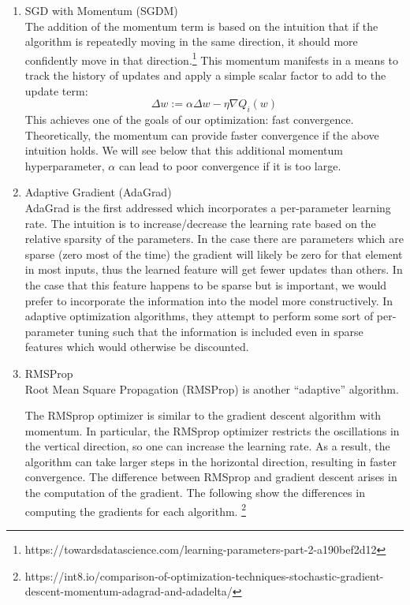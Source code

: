 \documentclass[twoside,11pt]{homework}
\DeclarePairedDelimiter{\2norm}{\lVert}{\rVert^2_2}
\newcommand{\1}[1]{\mathds{1}\left[#1\right]}
\begin{document}
\begin{enumerate}[\bf (i)]
\begin{enumerate}
      \item SGD with Momentum (SGDM) \\
        The addition of the momentum term is based on the intuition that if the
        algorithm is repeatedly moving in the same direction, it should more
        confidently move in that
        direction.\footnote{https://towardsdatascience.com/learning-parameters-part-2-a190bef2d12}
        This momentum manifests in a means to track the history of updates and
        apply a simple scalar factor to add to the update term:
        \[
        \Delta w := \alpha \Delta w - \eta \nabla Q_{i}(w)
        \]
        This achieves one of the goals of our optimization: fast convergence.
        Theoretically, the momentum can provide faster convergence if the above
        intuition holds. We will see below that this additional momentum
        hyperparameter, $\alpha$ can lead to poor convergence if it is too
        large.
       
      \item Adaptive Gradient (AdaGrad) \\
        AdaGrad is the first addressed which incorporates a per-parameter
        learning rate. The intuition is to increase/decrease the learning rate
        based on the relative sparsity of the parameters. In the case there are
        parameters which are sparse (zero most of the time) the gradient will
        likely be zero for that element in most inputs, thus the learned feature
        will get fewer updates than others. In the case that this feature
        happens to be sparse but is important, we would prefer to incorporate
        the information into the model more constructively. In adaptive
        optimization algorithms, they attempt to perform some sort of
        per-parameter tuning such that the information is included even in
        sparse features which would otherwise be discounted.

      \item RMSProp \\
        Root Mean Square Propagation (RMSProp) is another ``adaptive''
        algorithm. 
	
	The RMSprop optimizer is similar to the gradient descent algorithm with momentum. In particular, the RMSprop optimizer restricts the oscillations in the vertical direction, so one can increase the learning rate. As a result, the algorithm can take larger steps in the horizontal direction, resulting in faster convergence. The difference between RMSprop and gradient descent arises in the computation of the gradient. The following show the differences in computing the gradients for each algorithm. \footnote{https://int8.io/comparison-of-optimization-techniques-stochastic-gradient-descent-momentum-adagrad-and-adadelta/}


\end{enumerate}
\end{enumerate}
\end{document}
